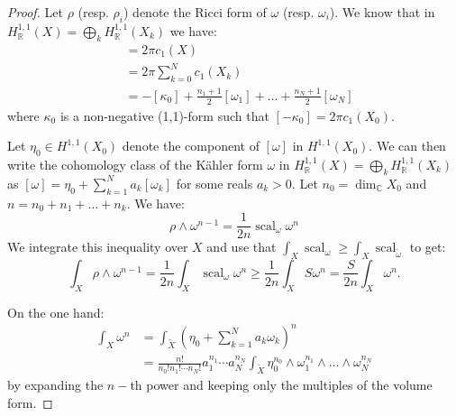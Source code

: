 \documentclass{amsart}
\numberwithin{equation}{section}
\theoremstyle{definition}
\DeclareMathOperator{\scal}{scal}
\begin{document}
\begin{proof}
Let $\rho$ (resp. $\rho_i$) denote the Ricci form of $\omega$ (resp. $\omega_i$). We know that in $H_{\mathbb{R}}^{1,1}(X)=\bigoplus_k H^{1,1}_\mathbb{R}(X_k)$ we have:
\begin{align*}
[\rho]&=2\pi c_1(X)\\
&=2\pi \sum_{k=0}^N c_1(X_k)\\
&=-[\kappa_0]+\frac{n_1+1}{2}[\omega_1]+\dots+\frac{n_N+1}{2}[\omega_N]
\end{align*}
where $\kappa_0$ is a non-negative (1,1)-form such that $[-\kappa_0]=2\pi c_1(X_0)$.

Let $\eta_0\in H^{1,1}(X_0)$ denote the component of $[\omega]$ in $H^{1,1}(X_0)$. We can then write the cohomology class of the K\"ahler form $\omega$ in $H_{\mathbb{R}}^{1,1}(X)=\bigoplus_k H^{1,1}_\mathbb{R}(X_k)$ as  $[\omega]=\eta_0+\sum_{k=1}^Na_k[\omega_k]$ for some reals $a_k>0$.
Let $n_0=\dim_\mathbb{C}X_0$ and $n=n_0+n_1+\dots+n_k$. We have:
\[
\rho\wedge\omega^{n-1}
= \frac{1}{2n}\scal_\omega\omega^n
\]
We integrate this inequality over $X$ and use that $\int_X\scal_\omega\geq\int_X\scal_{\tilde\omega}$
to get:
\[\int_{X}\rho\wedge\omega^{n-1}=\frac{1}{2n}\int_X\scal_\omega\omega^n\geq\frac{1}{2n}\int_X S\omega^n =\frac{S}{2n}\int_{X}\omega^n.\]

On the one hand:
\begin{align*}
\int_{X}\omega^{n}&=\int_{\tilde X}\left(\eta_0+\sum_{k=1}^Na_k\omega_k\right)^{n} \\
&=\frac{n!}{n_0!n_1!\cdots n_N!}a_1^{n_1}\cdots a_N^{n_N}\int_{\tilde X}\eta_0^{n_0}\wedge\omega_1^{n_1}\wedge\dots\wedge\omega_N^{n_N}
\end{align*}
by expanding the $n-$th power and keeping only the multiples of the volume form.


\end{proof}
\end{document}
